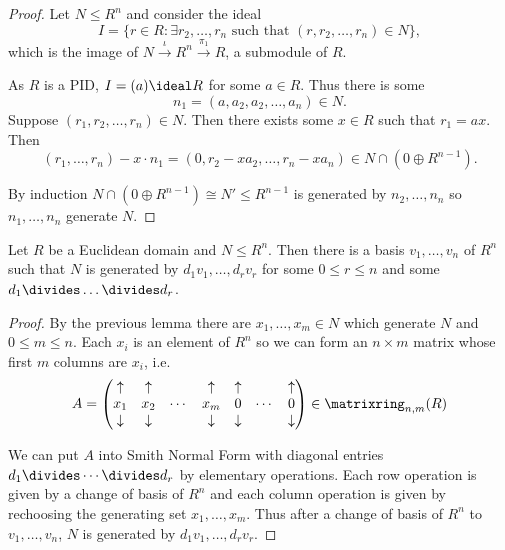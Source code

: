 \documentclass[a4paper]{article}
\theoremstyle{definition}
\begin{document}
\begin{proof}
  Let \(N \leq R^n\) and consider the ideal
  \[
    I = \{r \in R: \exists r_2, \dots, r_n \text{ such that } (r, r_2, \dots, r_n) \in N\},
  \]
  which is the image of \(N \stackrel{\iota}{\to} R^n \stackrel{\pi_1}{\to} R\), a submodule of \(R\).

    As \(R\) is a PID, \(I = (a) \ideal R\) for some \(a \in R\). Thus there is some
    \[
      n_1 = (a, a_2, a_2, \dots, a_n) \in N.
    \]
    Suppose \((r_1, r_2, \dots, r_n) \in N\). Then there exists some \(x \in R\) such that \(r_1 = ax\). Then
    \[
      (r_1, \dots, r_n) - x \cdot n_1 = (0, r_2 - xa_2, \dots, r_n - xa_n) \in N \cap (0 \oplus R^{n-1}).
    \]

    By induction \(N \cap (0 \oplus R^{n - 1}) \cong N' \leq R^{n - 1}\) is generated by \(n_2, \dots, n_n\) so \(n_1, \dots, n_n\) generate \(N\).
\end{proof}

\begin{theorem}
  Let \(R\) be a Euclidean domain and \(N \leq R^n\). Then there is a basis \(v_1, \dots, v_n\) of \(R^n\) such that \(N\) is generated by \(d_1v_1, \dots, d_rv_r\) for some \(0 \leq r \leq n\) and some \(d_1 \divides \dots \divides d_r\).
\end{theorem}

\begin{proof}
  By the previous lemma there are \(x_1, \dots, x_m \in N\) which generate \(N\) and \(0 \leq m \leq n\). Each \(x_i\) is an element of \(R^n\) so we can form an \(n \times m\) matrix whose first \(m\) columns are \(x_i\), i.e.
  \[
    A =
    \begin{pmatrix}
      \uparrow & \uparrow & & \uparrow & \uparrow & & \uparrow \\
      x_1 & x_2 & \cdots & x_m & 0 & \cdots & 0 \\
      \downarrow & \downarrow & & \downarrow & \downarrow & & \downarrow \\
    \end{pmatrix}
    \in \matrixring_{n, m}(R)
  \]

  We can put \(A\) into Smith Normal Form with diagonal entries \(d_1 \divides \cdots \divides d_r\) by elementary operations. Each row operation is given by a change of basis of \(R^n\) and each column operation is given by rechoosing the generating set \(x_1, \dots, x_m\). Thus after a change of basis of \(R^n\) to \(v_1, \dots, v_n\), \(N\) is generated by \(d_1v_1, \dots, d_rv_r\).
\end{proof}
\end{document}
